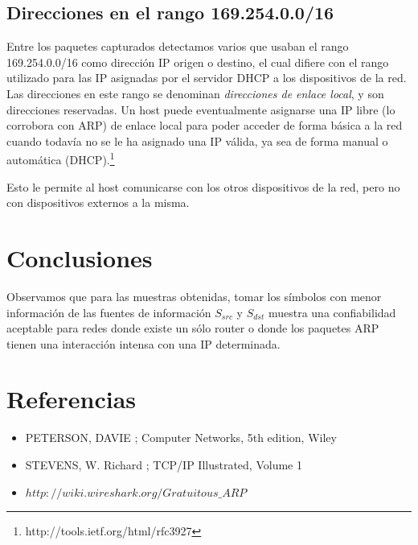 \documentclass[10pt, a4paper]{article}
\begin{document}
\subsection{Direcciones en el rango 169.254.0.0/16}

Entre los paquetes capturados detectamos varios que usaban el rango 169.254.0.0/16 como dirección IP origen o destino, el cual difiere con el rango utilizado para las IP asignadas por el servidor DHCP a los dispositivos de la red. Las direcciones en este rango se denominan \textit{direcciones de enlace local}, y son direcciones reservadas. Un host puede eventualmente asignarse una IP libre (lo corrobora con ARP) de enlace local para poder acceder de forma básica a la red cuando todavía no se le ha asignado una IP válida, ya sea de forma manual o automática (DHCP).\footnote{http://tools.ietf.org/html/rfc3927}

Esto le permite al host comunicarse con los otros dispositivos de la red, pero no con dispositivos externos a la misma.

\section{Conclusiones}
Observamos que para las muestras obtenidas, tomar los símbolos con menor información de las fuentes de información $S_{src}$ y $S_{dst}$ muestra una confiabilidad aceptable para redes donde existe un sólo router o donde los paquetes ARP tienen una interacción intensa con una IP determinada.

\section{Referencias}
\begin{itemize}
\item PETERSON, DAVIE ; Computer Networks, 5th edition, Wiley
\item STEVENS, W. Richard ; TCP/IP Illustrated, Volume 1

\item $http://wiki.wireshark.org/Gratuitous\_ARP$
\end{itemize}
\end{document}
